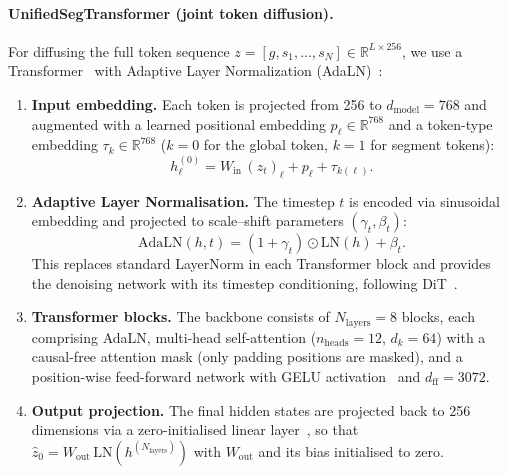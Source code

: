 \documentclass[12pt]{article}
\begin{document}
\paragraph{UnifiedSegTransformer (joint token diffusion).}
For diffusing the full token sequence $z = [g, s_1, \ldots, s_N] \in \mathbb{R}^{L \times 256}$,
we use a Transformer~\cite{vaswani2017attention} with
Adaptive Layer Normalization (AdaLN)~\cite{peebles2023dit}:

\begin{enumerate}
    \item \textbf{Input embedding.}
    Each token is projected from 256 to $d_{\mathrm{model}} = 768$
    and augmented with a learned positional embedding
    $p_\ell \in \mathbb{R}^{768}$ and a token-type embedding
    $\tau_k \in \mathbb{R}^{768}$ ($k = 0$ for the global token,
    $k = 1$ for segment tokens):
    \begin{equation}\label{eq:token-embed}
        h_\ell^{(0)} = W_{\mathrm{in}}\, (z_t)_\ell + p_\ell + \tau_{k(\ell)}.
    \end{equation}

    \item \textbf{Adaptive Layer Normalisation.}
    The timestep $t$ is encoded via sinusoidal embedding and
    projected to scale--shift parameters $(\gamma_t, \beta_t)$:
    \begin{equation}\label{eq:adaln}
        \mathrm{AdaLN}(h, t) = (1 + \gamma_t) \odot \mathrm{LN}(h) + \beta_t.
    \end{equation}
    This replaces standard LayerNorm in each Transformer block and
    provides the denoising network with its timestep conditioning,
    following DiT~\cite{peebles2023dit}.

    \item \textbf{Transformer blocks.}
    The backbone consists of $N_{\mathrm{layers}} = 8$ blocks,
    each comprising AdaLN, multi-head self-attention
    ($n_{\mathrm{heads}} = 12$, $d_k = 64$) with a causal-free
    attention mask (only padding positions are masked),
    and a position-wise feed-forward network with GELU
    activation~\cite{hendrycks2016gelu} and $d_{\mathrm{ff}} = 3072$.

    \item \textbf{Output projection.}
    The final hidden states are projected back to 256 dimensions
    via a zero-initialised linear layer~\cite{goyal2017accurate},
    so that $\hat{z}_0 = W_{\mathrm{out}}\, \mathrm{LN}(h^{(N_{\mathrm{layers}})})$
    with $W_{\mathrm{out}}$ and its bias initialised to zero.
\end{enumerate}
\end{document}
